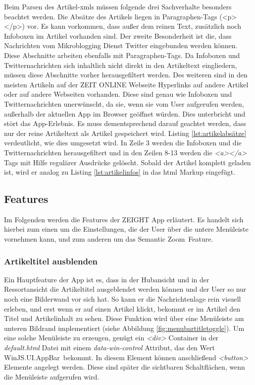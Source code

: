 \documentclass[12pt,a4paper,bibtotoc,abstracton]{scrartcl}
\begin{document}
Beim Parsen des Artikel-\ac{xml}s müssen folgende drei Sachverhalte besonders beachtet werden. Die Absätze des Artikels liegen in Paragraphen-Tags (<p></p>) vor. Es kann vorkommen, dass außer dem reinen Text, zusätzlich noch Infoboxen im Artikel vorhanden sind. Der zweite Besonderheit ist die, dass Nachrichten vom Mikroblogging Dienst Twitter eingebunden werden können. Diese Abschnitte arbeiten ebenfalls mit Paragraphen-Tags. Da Infoboxen und Twitternachrichten sich inhaltlich nicht direkt in den Artikeltext eingliedern, müssen diese Abschnitte vorher herausgefiltert werden. Des weiteren sind in den meisten Artikeln auf der ZEIT ONLINE Webseite Hyperlinks auf andere Artikel oder auf andere Webseiten vorhanden. Diese sind genau wie Infoboxen und Twitternachrichten unerwünscht, da sie, wenn sie vom User aufgerufen werden, außerhalb der aktuellen App im Browser geöffnet würden. Dies unterbricht und stört das App-Erlebnis. Es muss dementsprechend darauf geachtet werden, dass nur der reine Artikeltext als Artikel gespeichert wird. Listing \ref{lst:artikelabsätze} verdeutlicht, wie dies umgesetzt wird. In Zeile 3 werden die Infoboxen und die Twitternachrichten herausgefiltert und in den Zeilen 8-13 werden die \textit{<a></a>} Tags mit Hilfe regulärer Ausdrücke gelöscht. Sobald der Artikel komplett geladen ist, wird er analog zu Listing \ref{lst:artikelinfos} in das \ac{html} Markup eingefügt.

\begin{minipage}{\linewidth}
  
\end{minipage}

\subsection{Features}
\label{subsec:features}
Im Folgenden werden die Features der ZEIGHT App erläutert. Es handelt sich hierbei zum einen um die Einstellungen, die der User über die untere Menüleiste vornehmen kann, und zum anderen um das \glqq Semantic Zoom\grqq\ Feature.

\subsubsection{Artikeltitel ausblenden}
\label{subsubsec:artikeltitelausblenden}
Ein Hauptfeature der App ist es, dass in der Hubansicht und in der Ressortansicht die Artikeltitel ausgeblendet werden können und der User so nur noch eine Bilderwand vor sich hat. So kann er die Nachrichtenlage rein visuell erleben, und erst wenn er auf einen Artikel klickt, bekommt er im Artikel den Titel und Artikelinhalt zu sehen. Diese Funktion wird über eine Menüleiste am unteren Bildrand implementiert (siehe Abbildung \ref{fig:menubartitletoggle}). Um eine solche Menüleiste zu erzeugen, genügt ein \textit{<div>} Container in der \textit{default.html} Datei mit einem \textit{data-win-control} Attribut, das den Wert \glqq WinJS.UI.AppBar\grqq\ bekommt. In diesem Element können anschließend \textit{<button>} Elemente angelegt werden. Diese sind später die sichtbaren Schaltflächen, wenn die Menüleiste aufgerufen wird.
\end{document}
